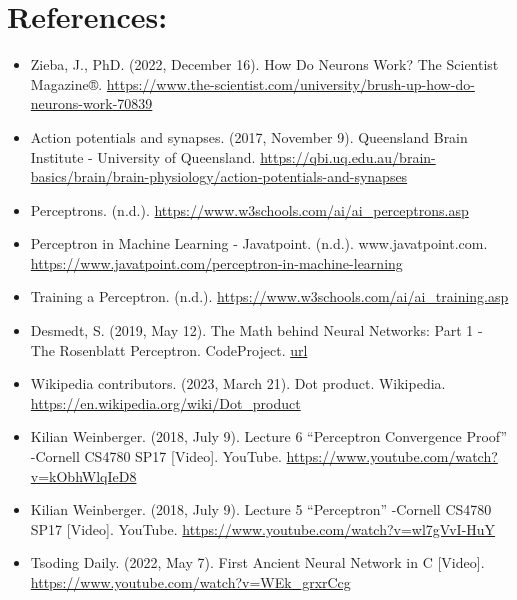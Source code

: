 \documentclass[12pt]{article}
\begin{document}
\section{References:}
\begin{itemize}
\item Zieba, J., PhD. (2022, December 16). How Do Neurons Work? The Scientist Magazine®.
  \url{https://www.the-scientist.com/university/brush-up-how-do-neurons-work-70839}
\item Action potentials and synapses. (2017, November 9). Queensland Brain Institute - University
  of Queensland.
  \url{https://qbi.uq.edu.au/brain-basics/brain/brain-physiology/action-potentials-and-synapses}
\item Perceptrons. (n.d.). \url{https://www.w3schools.com/ai/ai_perceptrons.asp}
\item Perceptron in Machine Learning - Javatpoint. (n.d.). www.javatpoint.com.
  \url{https://www.javatpoint.com/perceptron-in-machine-learning}
\item Training a Perceptron. (n.d.). \url{https://www.w3schools.com/ai/ai_training.asp}
\item Desmedt, S. (2019, May 12). The Math behind Neural Networks: Part 1 - The Rosenblatt Perceptron.
  CodeProject.
  \href{https://www.codeproject.com/Articles/4047091/The-Math-behind-Neural-Networks-Part-1-The-Rosenbl}{
    url}
\item Wikipedia contributors. (2023, March 21). Dot product. Wikipedia.
  \url{https://en.wikipedia.org/wiki/Dot_product}
\item Kilian Weinberger. (2018, July 9). Lecture 6 “Perceptron Convergence Proof” -Cornell
  CS4780 SP17 [Video]. YouTube. \url{https://www.youtube.com/watch?v=kObhWlqIeD8}
\item Kilian Weinberger. (2018, July 9). Lecture 5 “Perceptron” -Cornell
  CS4780 SP17 [Video]. YouTube. \url{https://www.youtube.com/watch?v=wl7gVvI-HuY}
\item Tsoding Daily. (2022, May 7).
  First Ancient Neural Network in C [Video]. \url{https://www.youtube.com/watch?v=WEk_grxrCcg}
\end{itemize}
\end{document}
